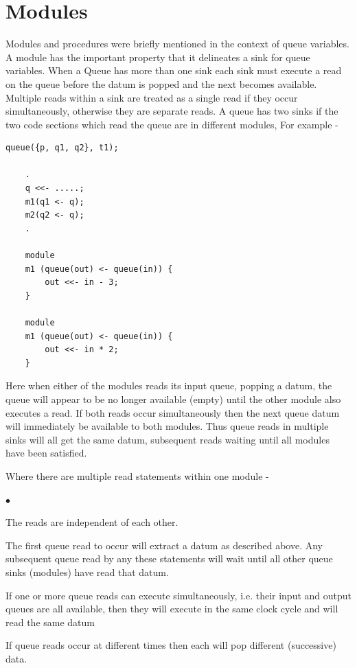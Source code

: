 \documentclass[10pt,a4paper,twoside,fleqn]{article}
\newcommand{\blist}{\begin{list}{$\bullet$}{\setlength{\itemsep}{-5pt}\setlength{\topsep}{-5pt}}}
\newcommand{\blend}{\end{list}}
\begin{document}
\section{Modules}

    Modules and procedures were briefly mentioned in the context of queue variables. A
    module has the important property that it delineates a sink for queue variables.
    When a Queue has more than one sink each sink must execute a read on the queue
    before the datum is popped and the next becomes available. Multiple reads within a
    sink are treated as a single read if they occur simultaneously, otherwise they are
    separate reads. A queue has two sinks if the two code sections which read the queue
    are in different modules, For example -
    \begin{lstlisting}[language=threepl]
    queue({p, q1, q2}, t1);
    
    .
    q <<- .....;
    m1(q1 <- q);
    m2(q2 <- q);
    .
    
    module
    m1 (queue(out) <- queue(in)) {
        out <<- in - 3;
    }
    
    module
    m1 (queue(out) <- queue(in)) {
        out <<- in * 2;
    }
    \end{lstlisting}
    Here when either of the modules reads its input queue, popping a datum, the queue
    will appear to be no longer available (empty) until the other module also executes a
    read. If both reads occur simultaneously then the next queue datum will immediately
    be available to both modules. Thus queue reads in multiple sinks will all get the
    same datum, subsequent reads waiting until all modules have been satisfied.
    
    Where there are multiple read statements within one module -
    \blist
    \item   The reads are independent of each other.
    \item   The first queue read to occur will extract a datum as described above.
            Any subsequent queue read by any these statements will wait until
            all other queue sinks (modules) have read that datum.
    \item   If one or more queue reads can execute simultaneously, i.e. their
            input and output queues are all available, then they will execute
            in the same clock cycle and will read the same datum
    \item   If queue reads occur at different times then each will pop
            different (successive) data.
    \blend
    
\end{document}
